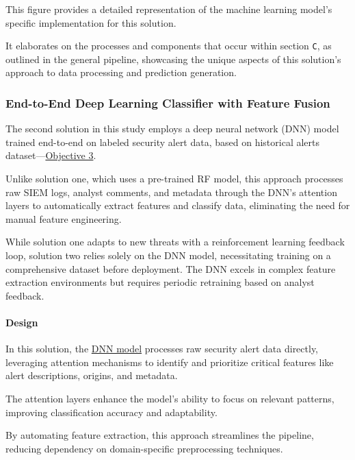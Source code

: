 This figure provides a detailed representation of the machine learning model's specific implementation for this solution. 

It elaborates on the processes and components that occur within section \texttt{C}, as outlined in the general pipeline, showcasing the unique aspects of this solution's approach to data processing and prediction generation.

\subsubsection{End-to-End Deep Learning Classifier with Feature Fusion}
The second solution in this study employs a deep neural network (DNN) model trained end-to-end on labeled security alert data, based on historical alerts dataset—\hyperref[objective3]{Objective 3}. 

Unlike solution one, which uses a pre-trained RF model, this approach processes raw SIEM logs, analyst comments, and metadata through the DNN's attention layers to automatically extract features and classify data, eliminating the need for manual feature engineering.

While solution one adapts to new threats with a reinforcement learning feedback loop, solution two relies solely on the DNN model, necessitating training on a comprehensive dataset before deployment. 
The DNN excels in complex feature extraction environments but requires periodic retraining based on analyst feedback.

\paragraph{Design}

In this solution, the \underline{DNN model} processes raw security alert data directly, leveraging attention mechanisms to identify and prioritize critical features like alert descriptions, origins, and metadata. 

The attention layers enhance the model's ability to focus on relevant patterns, improving classification accuracy and adaptability. 

By automating feature extraction, this approach streamlines the pipeline, reducing dependency on domain-specific preprocessing techniques.

